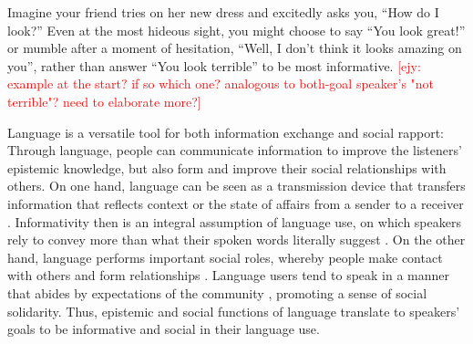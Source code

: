 \documentclass[12pt]{article}
\newcommand{\ejy}[1]{\textcolor{Red}{[ejy: #1]}}
\begin{document}


Imagine your friend tries on her new dress and excitedly asks you, \enquote{How do I look?} 
Even at the most hideous sight, you might choose to say \enquote{You look great!} or mumble
after a moment of hesitation, \enquote{Well, I don't think it looks amazing on you},
rather than answer \enquote{You look terrible} to be most informative. \ejy{example at the start? if so which one? analogous to both-goal speaker's "not terrible"? need to elaborate more?}

Language is a versatile tool for both information exchange and social rapport: 
Through language, people can communicate information to improve the listeners' epistemic knowledge, 
but also form and improve their social relationships with others.
On one hand, language can be seen as a transmission device that transfers information 
that reflects context or the state of affairs from a sender to a receiver \cite{buhler1934, shannon1948, jakobson1960}.
Informativity then is an integral assumption of language use, 
on which speakers rely to convey more than what their spoken words literally suggest \cite{grice1975, searle1975}.
On the other hand, language performs important social roles, 
whereby people make contact with others and form relationships \cite{halliday1975, ervin1967}. 
Language users tend to speak in a manner that abides by expectations of the community \cite{ervin1969}, 
promoting a sense of social solidarity. 
Thus, epistemic and social functions of language translate to speakers' goals to be informative and social in their language use.
 
\end{document}
